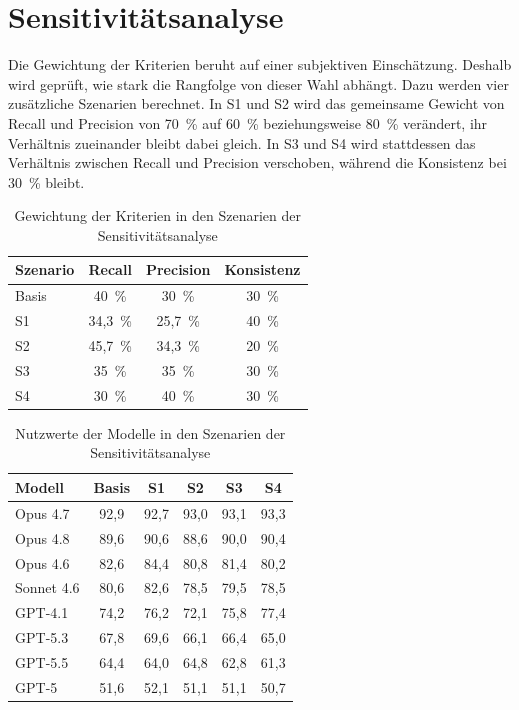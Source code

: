 \section{Sensitivitätsanalyse}
\label{sec:sensitivitaetsanalyse}

Die Gewichtung der Kriterien beruht auf einer subjektiven Einschätzung. Deshalb wird geprüft, wie stark die Rangfolge von dieser Wahl abhängt. Dazu werden vier zusätzliche Szenarien berechnet. In S1 und S2 wird das gemeinsame Gewicht von Recall und Precision von 70~\% auf 60~\% beziehungsweise 80~\% verändert, ihr Verhältnis zueinander bleibt dabei gleich. In S3 und S4 wird stattdessen das Verhältnis zwischen Recall und Precision verschoben, während die Konsistenz bei 30~\% bleibt.

\begin{table}[H]
  \centering
  \begin{tabular}{lccc}
    \hline
    Szenario & Recall & Precision & Konsistenz \\
    \hline
    Basis & 40~\% & 30~\% & 30~\% \\
    S1    & 34,3~\% & 25,7~\% & 40~\% \\
    S2    & 45,7~\% & 34,3~\% & 20~\% \\
    S3    & 35~\% & 35~\% & 30~\% \\
    S4    & 30~\% & 40~\% & 30~\% \\
    \hline
  \end{tabular}
  \caption{Gewichtung der Kriterien in den Szenarien der Sensitivitätsanalyse}
  \label{tab:szenarien}
\end{table}

\begin{table}[H]
  \centering
  \begin{tabular}{lccccc}
    \hline
    Modell & Basis & S1 & S2 & S3 & S4 \\
    \hline
    Opus 4.7   & 92,9 & 92,7 & 93,0 & 93,1 & 93,3 \\
    Opus 4.8   & 89,6 & 90,6 & 88,6 & 90,0 & 90,4 \\
    Opus 4.6   & 82,6 & 84,4 & 80,8 & 81,4 & 80,2 \\
    Sonnet 4.6 & 80,6 & 82,6 & 78,5 & 79,5 & 78,5 \\
    GPT-4.1    & 74,2 & 76,2 & 72,1 & 75,8 & 77,4 \\
    GPT-5.3    & 67,8 & 69,6 & 66,1 & 66,4 & 65,0 \\
    GPT-5.5    & 64,4 & 64,0 & 64,8 & 62,8 & 61,3 \\
    GPT-5      & 51,6 & 52,1 & 51,1 & 51,1 & 50,7 \\
    \hline
  \end{tabular}
  \caption{Nutzwerte der Modelle in den Szenarien der Sensitivitätsanalyse}
  \label{tab:sensitivitaet}
\end{table}

